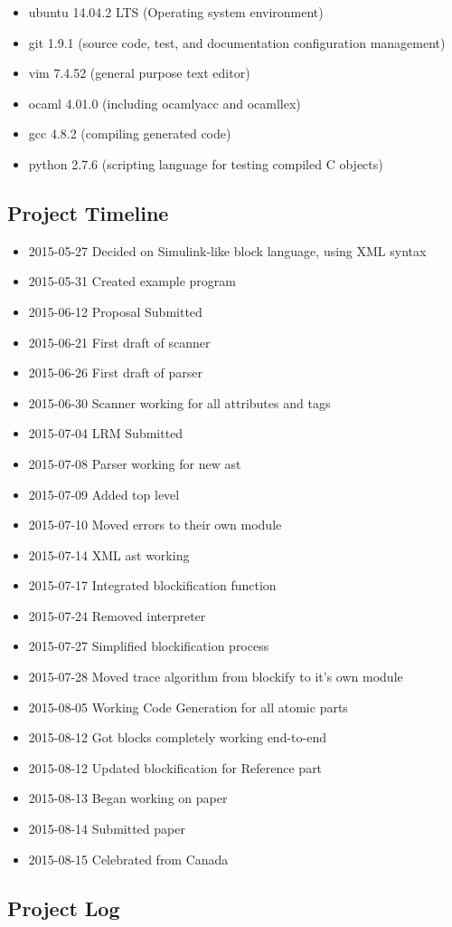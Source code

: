 \begin{itemize}
\item ubuntu 14.04.2 LTS (Operating system environment)
\item git 1.9.1 (source code, test, and documentation configuration management)
\item vim 7.4.52 (general purpose text editor)
\item ocaml 4.01.0 (including ocamlyacc and ocamllex)
\item gcc 4.8.2 (compiling generated code)
\item python 2.7.6 (scripting language for testing compiled C objects)
\end{itemize}

\subsection{Project Timeline}

\begin{itemize}
\item 2015-05-27  Decided on Simulink-like block language, using XML syntax
\item 2015-05-31  Created example program
\item 2015-06-12  Proposal Submitted
\item 2015-06-21  First draft of scanner
\item 2015-06-26  First draft of parser
\item 2015-06-30  Scanner working for all attributes and tags
\item 2015-07-04  LRM Submitted
\item 2015-07-08  Parser working for new ast
\item 2015-07-09  Added top level
\item 2015-07-10  Moved errors to their own module
\item 2015-07-14  XML ast working
\item 2015-07-17  Integrated blockification function
\item 2015-07-24  Removed interpreter
\item 2015-07-27  Simplified blockification process
\item 2015-07-28  Moved trace algorithm from blockify to it's own module
\item 2015-08-05  Working Code Generation for all atomic parts
\item 2015-08-12  Got blocks completely working end-to-end
\item 2015-08-12  Updated blockification for Reference part
\item 2015-08-13  Began working on paper
\item 2015-08-14  Submitted paper
\item 2015-08-15  Celebrated from Canada
\end{itemize}

\subsection{Project Log}
